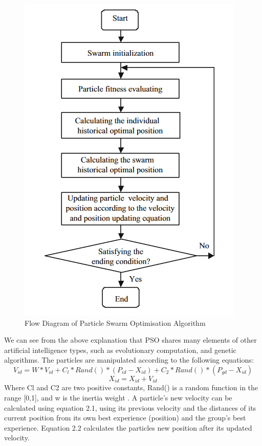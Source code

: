 \documentclass[oneside,12pt]{book}
\begin{document}
\begin{figure}[H]
    \centering
    \includegraphics[scale=0.6]{Images/PSO_Flow.png}
    \caption{Flow Diagram of Particle Swarm Optimisation Algorithm \protect\cite{wang_tan_liu_2017}}
    \label{fig:Flow Diagram of Particle Swarm Optimisation Algorithm}
\end{figure}

We can see from the above explanation that PSO shares many elements of other artificial intelligence types, such as evolutionary computation, and genetic algorithms. The particles are manipulated according to the following equations: 
\begin{equation}
V_{id} = W * V_{id} + C_l * Rand( ) * ( P_{id} - X_{id} ) + C_2 * Rand( ) * (P_{gd} - X_{id})
\end{equation}
\begin{equation}
X_{id} = X_{id} + V_{id}
\end{equation}
Where Cl and C2 are two positive constants, Rand() is a random function in the range [0,1], and w is the inertia weight \cite{shi1998parameter}. A particle's new velocity can be calculated using equation 2.1, using its previous velocity and the distances of its current position from its own best experience (position) and the group's best experience. Equation 2.2 calculates the particles new position after its updated velocity. 
\end{document}
